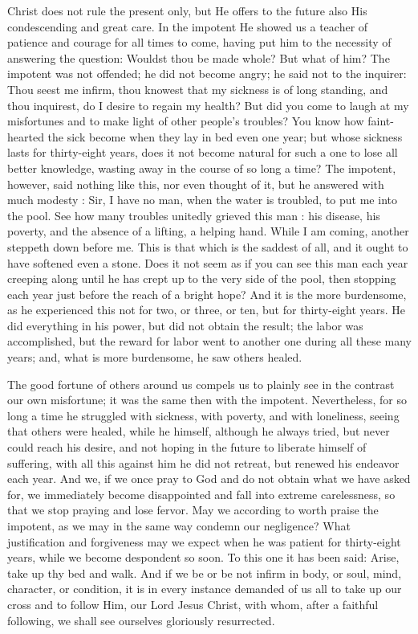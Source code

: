 Christ does not rule the present only, but He 
offers to the future also His condescending and 
great care. In the impotent He showed us a 
teacher of patience and courage for all times to 
come, having put him to the necessity of answering
the question: Wouldst thou be made whole? 
But what of him? The impotent was not 
offended; he did not become angry; he said not 
to the inquirer: Thou seest me infirm, thou 
knowest that my sickness is of long standing, 
and thou inquirest, do I desire to regain my 
health? But did you come to laugh at my misfortunes
and to make light of other people's 
troubles? You know how faint-hearted the sick 
become when they lay in bed even one year; but 
whose sickness lasts for thirty-eight years, does 
it not become natural for such a one to lose all 
better knowledge, wasting away in the course of 
so long a time? The impotent, however, said 
nothing like this, nor even thought of it, but he 
answered with much modesty : Sir, I have no 
man, when the water is troubled, to put me into 
the pool. See how many troubles unitedly 
grieved this man : his disease, his poverty, and 
the absence of a lifting, a helping hand. While 
I am coming, another steppeth down before me. 
This is that which is the saddest of all, and it 
ought to have softened even a stone. Does it 
not seem as if you can see this man each year 
creeping along until he has crept up to the very 
side of the pool, then stopping each year just 
before the reach of a bright hope? And it is 
the more burdensome, as he experienced this not
for two, or three, or ten, but for thirty-eight 
years. He did everything in his power, but did 
not obtain the result; the labor was accomplished, 
but the reward for labor went to another one 
during all these many years; and, what is more 
burdensome, he saw others healed. 

The good fortune of others around us compels 
us to plainly see in the contrast our own misfortune; 
it was the same then with the impotent. 
Nevertheless, for so long a time he struggled 
with sickness, with poverty, and with loneliness, 
seeing that others were healed, while he himself, 
although he always tried, but never could reach 
his desire, and not hoping in the future to liberate
himself of suffering, with all this against 
him he did not retreat, but renewed his endeavor 
each year. And we, if we once pray to God and 
do not obtain what we have asked for, we immediately
become disappointed and fall into extreme 
carelessness, so that we stop praying and lose 
fervor. May we according to worth praise the 
impotent, as we may in the same way condemn 
our negligence? What justification and forgiveness
may we expect when he was patient for 
thirty-eight years, while we become despondent 
so soon. To this one it has been said: Arise, 
take up thy bed and walk. And if we be or be 
not infirm in body, or soul, mind, character, or
condition, it is in every instance demanded of us 
all to take up our cross and to follow Him, our 
Lord Jesus Christ, with whom, after a faithful 
following, we shall see ourselves gloriously resurrected.

